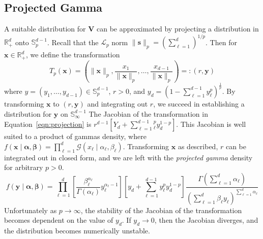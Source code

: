 \subsection{Projected Gamma}
A suitable distribution for $\bm{V}$ can be approximated by projecting a 
    distribution in $\mathbb{R}_+^d$ onto $\mathbb{S}_{p}^{d-1}$.  
    Recall that the $\mathcal{L}_p$ norm 
    $\lVert \bm{s}\rVert_p = \left(\sum_{\ell = 1}^d\right)^{1/p}$.  Then
    for $\bm{x}\in\mathbb{R}_+^d$, we define the transformation
    \begin{equation}
    \label{eqn:projection}
        T_p(\bm{x}) = \left(\lVert \bm{x}\rVert_p, 
            \frac{x_1}{\lVert \bm{x}\rVert_p},\ldots, 
                \frac{x_{d-1}}{\lVert \bm{x}\rVert_p}\right)
                =: (r,\bm{y})
    \end{equation}
    where $y = (y_1,\ldots,y_{d-1}) \in \mathbb{S}_{p}^{d-1}$, $r > 0$, and 
    $y_d = \left(1 - \sum_{\ell = 1}^{d-1}y_{\ell}^p\right)^{\frac{1}{p}}$.
    By transforming $\bm{x}$ to $(r,\bm{y})$ and integrating out $r$, we
    succeed in establishing a distribution for $\bm{y}$ on 
    $\mathbb{S}_{\infty}^{d-1}$
    The Jacobian of the transformation in Equation~\eqref{eqn:projection} is
    $r^{d-1}\left[Y_d + \sum_{\ell = 1}^{d-1}_{\ell}^py_d^{1-p}\right]$.
    This Jacobian is well suited to a product of gammas density, where 
    $f(\bm{x}\mid\bm{\alpha},\bm{\beta}) = 
        \prod_{\ell = 1}^d\mathcal{G}(x_{\ell}\mid\alpha_{\ell},\beta_{\ell})$.
    Transforming $\bm{x}$ as described, $r$ can be integrated out in closed
    form, and we are left with the \emph{projected gamma} density for arbitrary 
    $p > 0$.
    \[
        f(\bm{y}\mid\bm{\alpha},\bm{\beta}) = \prod_{\ell = 1}^d\left[
            \frac{\beta_{\ell}^{\alpha_{\ell}}}{\Gamma(\alpha_{\ell})}
            y_{\ell}^{\alpha_{\ell} - 1}\right]
            \left[y_d + \sum_{\ell = 1}^{d-1}y_{\ell}^py_d^{1-p}\right]
            \frac{\Gamma(\sum_{\ell = 1}^d \alpha_{\ell})}{\left(
                \sum_{\ell = 1}^d\beta_{\ell}y_{\ell}
                \right)^{\sum_{\ell = 1}^d \alpha_{\ell}}
            }
    \]
    Unfortunately as $p\to\infty$, the stability of the Jacobian of the
    transformation becomes dependent on the value of $y_d$.  If $y_d\to 0$,
    then the Jacobian diverges, and the distribution becomes numerically
    unstable.





